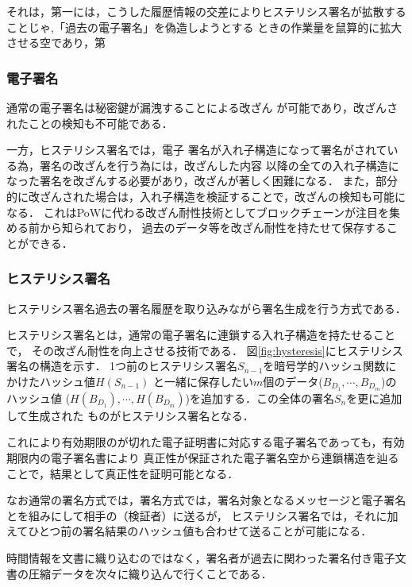 \documentclass[a4paper,12pt]{jsarticle}
\begin{document}
それは，第一には，こうした履歴情報の交差によりヒステリシス署名が拡散することじゃ,「過去の電子署名」を偽造しようとする
ときの作業量を鼠算的に拡大させる空であり，第

\subsubsection{電子署名}
通常の電子署名は秘密鍵が漏洩することによる改ざん
が可能であり，改ざんされたことの検知も不可能である．

一方，ヒステリシス署名では，電子
署名が入れ子構造になって署名がされている為，署名の改ざんを行う為には，改ざんした内容
以降の全ての入れ子構造になった署名を改ざんする必要があり，改ざんが著しく困難になる．
また，部分的に改ざんされた場合は，入れ子構造を検証することで，改ざんの検知も可能になる．
これはPoWに代わる改ざん耐性技術としてブロックチェーンが注目を集める前から知られており，
過去のデータ等を改ざん耐性を持たせて保存することができる．

\subsubsection{ヒステリシス署名}

ヒステリシス署名過去の署名履歴を取り込みながら署名生成を行う方式である．

ヒステリシス署名\cite{suzaki}とは，通常の電子署名に連鎖する入れ子構造を持たせることで，
その改ざん耐性を向上させる技術である．
図\ref{fig:hysteresis}にヒステリシス署名の構造を示す．
1つ前のヒステリシス署名$S_{n-1}$を暗号学的ハッシュ関数にかけたハッシュ値$H(S_{n-1})$
と一緒に保存したい$m$個のデータ($B_{D_1}, \cdots, B_{D_m}$)のハッシュ値
($H(B_{D_1}), \cdots, H(B_{D_m})$)を追加する．この全体の署名$S_n$を更に追加して生成された
ものがヒステリシス署名となる．

これにより有効期限のが切れた電子証明書に対応する電子署名であっても，有効期限内の電子署名書により
真正性が保証された電子署名空から連鎖構造を辿ることで，結果として真正性を証明可能となる．

なお通常の署名方式では，署名方式では，署名対象となるメッセージと電子署名とを組みにして相手の（検証者）に送るが，
ヒステリシス署名では，それに加えてひとつ前の署名結果のハッシュ値も合わせて送ることが可能になる．

時間情報を文書に織り込むのではなく，署名者が過去に関わった署名付き電子文書の圧縮データを次々に織り込んで行くことである．


\end{document}
